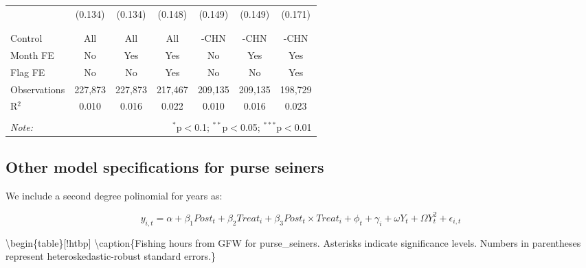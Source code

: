 \documentclass[11pt,]{article}
\begin{document}
\begin{table}[!htbp]
\begin{tabular}{@{\extracolsep{1pt}}lcccccc}
  & (0.134) & (0.134) & (0.148) & (0.149) & (0.149) & (0.171) \\ 
  & & & & & & \\ 
\hline \\[-1.8ex] 
Control & All & All & All & -CHN & -CHN & -CHN \\ 
Month FE & No & Yes & Yes & No & Yes & Yes \\ 
Flag FE & No & No & Yes & No & No & Yes \\ 
Observations & 227,873 & 227,873 & 217,467 & 209,135 & 209,135 & 198,729 \\ 
R$^{2}$ & 0.010 & 0.016 & 0.022 & 0.010 & 0.016 & 0.023 \\ 
\hline 
\hline \\[-1.8ex] 
\textit{Note:}  & \multicolumn{6}{r}{$^{*}$p$<$0.1; $^{**}$p$<$0.05; $^{***}$p$<$0.01} \\ 
\end{tabular} 
\end{table}

\clearpage

\hypertarget{other-model-specifications-for-purse-seiners}{%
\subsection{Other model specifications for purse
seiners}\label{other-model-specifications-for-purse-seiners}}

We include a second degree polinomial for years as:

\[
y_{i,t} = \alpha + \beta_1 Post_t + \beta_2 Treat_i + \beta_3 Post_t \times Treat_i + \phi_t + \gamma_i + \omega Y_t + \Omega Y_t^2 + \epsilon_{i,t}
\]

\textbackslash{}begin\{table\}{[}!htbp{]} \centering 
\textbackslash{}caption\{\label{tab:purse}Fishing hours from GFW for
purse\_seiners. Asterisks indicate significance levels. Numbers in
parentheses represent heteroskedastic-robust standard errors.\} \label{}
\end{document}
